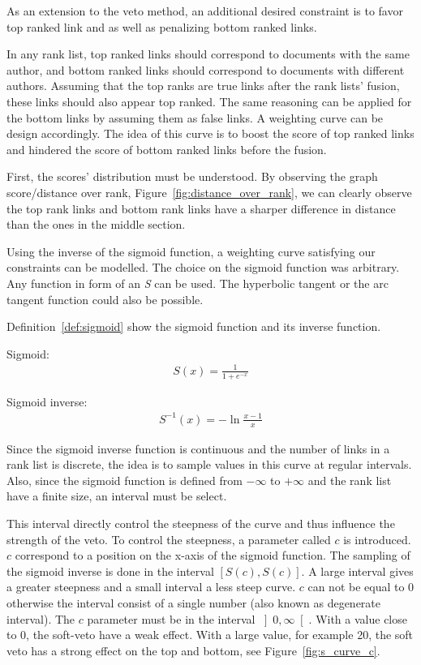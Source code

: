 As an extension to the veto method, an additional desired constraint is to favor top ranked link and as well as penalizing bottom ranked links.

In any rank list, top ranked links should correspond to documents with the same author, and bottom ranked links should correspond to documents with different authors.
Assuming that the top ranks are true links after the rank lists' fusion, these links should also appear top ranked.
The same reasoning can be applied for the bottom links by assuming them as false links.
A weighting curve can be design accordingly.
The idea of this curve is to boost the score of top ranked links and hindered the score of bottom ranked links before the fusion.

First, the scores' distribution must be understood.
By observing the graph score/distance over rank, Figure~\ref{fig:distance_over_rank}, we can clearly observe the top rank links and bottom rank links have a sharper difference in distance than the ones in the middle section.

Using the inverse of the sigmoid function, a weighting curve satisfying our constraints can be modelled.
The choice on the sigmoid function was arbitrary.
Any function in form of an \textit{S} can be used.
The hyperbolic tangent or the arc tangent function could also be possible.

Definition~\ref{def:sigmoid} show the sigmoid function and its inverse function.

\begin{definition}
  Sigmoid:
  \begin{gather*}
    S(x) = \frac{1}{1+e^{-x}}
  \end{gather*}

  Sigmoid inverse:
  \begin{gather*}
    S^{-1}(x) = -\ln{\frac{x-1}{x}}
  \end{gather*}
\end{definition}

Since the sigmoid inverse function is continuous and the number of links in a rank list is discrete, the idea is to sample values in this curve at regular intervals.
Also, since the sigmoid function is defined from $-\infty$ to $+\infty$ and the rank list have a finite size, an interval must be select.

This interval directly control the steepness of the curve and thus influence the strength of the veto.
To control the steepness, a parameter called $c$ is introduced.
$c$ correspond to a position on the x-axis of the sigmoid function.
The sampling of the sigmoid inverse is done in the interval $\left[S(c), S(c)\right]$.
A large interval gives a greater steepness and a small interval a less steep curve.
$c$ can not be equal to 0 otherwise the interval consist of a single number (also known as degenerate interval).
The $c$ parameter must be in the interval $\left]0, \infty\right[$.
With a value close to $0$, the soft-veto have a weak effect.
With a large value, for example 20, the soft veto has a strong effect on the top and bottom, see Figure~\ref{fig:s_curve_c}.

